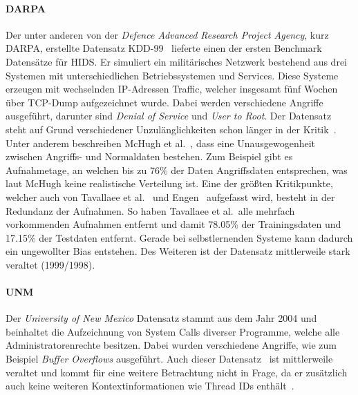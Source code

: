             \paragraph{DARPA}
                Der unter anderen von der \textit{Defence Advanced Research Project Agency}, kurz DARPA, erstellte Datensatz KDD-99~\cite{DARPA} lieferte einen der ersten Benchmark Datensätze für \ac{HIDS}.
                Er simuliert ein militärisches Netzwerk bestehend aus drei Systemen mit unterschiedlichen Betriebssystemen und Services.
                Diese Systeme erzeugen mit wechselnden IP-Adressen Traffic, welcher insgesamt fünf Wochen über TCP-Dump aufgezeichnet wurde.
                Dabei werden verschiedene Angriffe ausgeführt, darunter sind \textit{Denial of Service} und \textit{User to Root}.
                Der Datensatz steht auf Grund verschiedener Unzulänglichkeiten schon länger in der Kritik~\cite{KDDCRITIC, UNM, KDDCRITIC2}.
                Unter anderem beschreiben McHugh et al.~\cite{KDDMCHUGH}, dass eine Unausgewogenheit zwischen Angriffs- und Normaldaten bestehen.
                Zum Beispiel gibt es Aufnahmetage, an welchen bis zu 76\% der Daten Angriffsdaten entsprechen, was laut McHugh keine realistische Verteilung ist.
                Eine der größten Kritikpunkte, welcher auch von Tavallaee et al.~\cite{KDDCRITIC2} und Engen~\cite{ENGEN2010} aufgefasst wird, besteht in der Redundanz der Aufnahmen.
                So haben Tavallaee et al.\ alle mehrfach vorkommenden Aufnahmen entfernt und damit 78.05\% der Trainingsdaten und 17.15\% der Testdaten entfernt.
                Gerade bei selbstlernenden Systeme kann dadurch ein ungewollter Bias entstehen.
                Des Weiteren ist der Datensatz mittlerweile stark veraltet (1999/1998).
            \paragraph{UNM}
                Der \textit{University of New Mexico} Datensatz stammt aus dem Jahr 2004 und beinhaltet die Aufzeichnung von System Calls diverser Programme, welche alle Administratorenrechte besitzen.
                Dabei wurden verschiedene Angriffe, wie zum Beispiel \textit{Buffer  Overflows} ausgeführt.
                Auch dieser Datensatz~\cite{UNM} ist mittlerweile veraltet und kommt für eine weitere Betrachtung nicht in Frage,
                da er zusätzlich auch keine weiteren Kontextinformationen wie Thread IDs enthält~\cite{UNMcritic}.
